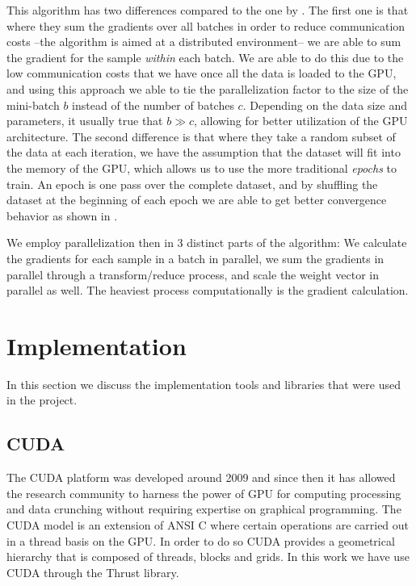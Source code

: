 \documentclass[11pt,a4paper]{article}
\begin{document}
This algorithm has two differences compared to the one by \cite{dekel2012optimal}.
The first one is that where
they sum the gradients over all batches in order to reduce communication costs --the algorithm is
aimed at a distributed environment-- we are able to sum the gradient for the sample \textit{within}
each batch. We are able to do this due to the low communication costs that we have once all the
data is loaded to the GPU, and using this approach we able to tie the parallelization factor to the
size of the mini-batch $b$ instead of the number of batches $c$. Depending on the data size and
parameters, it usually true that $b \gg c$, allowing for better utilization of the GPU
architecture.
The second difference is that where they take a random subset of the data at each iteration,
we have the assumption that the dataset will fit into the memory of the GPU, which allows us
to use the more traditional \textit{epochs} to train. An epoch is one pass over the complete
dataset, and by shuffling the dataset at the beginning of each epoch we are able to get better
convergence behavior as shown in \cite{bottou2010large}.

We employ parallelization then in 3 distinct parts of the algorithm: We calculate the gradients for
each sample in a batch in parallel, we sum the gradients in parallel through a transform/reduce
process, and scale the weight vector in parallel as well. The heaviest process computationally is
the gradient calculation.


\section{Implementation}
In this section we discuss the implementation tools and libraries that were used in the project.

\subsection{CUDA}
The CUDA platform was developed around 2009 \citep{nickolls2008scalable} and since then it has
allowed the research community to harness the power of GPU for computing processing and data
crunching without requiring expertise on graphical programming. The CUDA model is an extension of
ANSI C where certain operations are carried out in a thread basis on the GPU. In order to do so
CUDA provides a geometrical hierarchy that is composed of threads, blocks and grids. In this work
we have use CUDA through the Thrust library.
\end{document}
